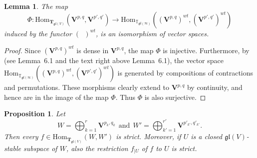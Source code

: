 \documentclass[12pt,reqno]{amsart}
\newcommand{\Hom}{\mathrm{Hom}}
\newtheorem{lem}[thm]{Lemma}
\newtheorem{prop}[thm]{Proposition}
\theoremstyle{definition}
\theoremstyle{remark}
\begin{document}
	
	\begin{lem}\label{lem:full}
	The map 
	$$\Phi:\Hom_{\mathbf{T}_{\mathfrak{gl}(V)}}(\mathbf{V}^{p,q}, \mathbf{V}^{p', q'})
	\rightarrow
	\Hom_{\mathbb{T}_{\mathfrak{gl}(\infty)}}((\mathbf{V}^{p,q})^{wt}, (\mathbf{V}^{p', q'})^{wt})
	$$
	induced by the functor $(\phantom{a})^{wt}$, is an isomorphism of vector spaces.
	\end{lem}
	
	\begin{proof}
	Since $(\mathbf{V}^{p,q})^{wt}$ is dense in $\mathbf{V}^{p,q}$, the map $\Phi$ is injective. Furthermore, by \cite{DPS} (see Lemma~6.1 and the text right above Lemma~6.1), the vector space $\Hom_{\mathbb{T}_{\mathfrak{gl}(\infty)}}((\mathbf{V}^{p,q})^{wt}, (\mathbf{V}^{p', q'})^{wt})$ is generated by compositions of contractions and permutations. These morphisms clearly extend  to $\mathbf{V}^{p,q}$ by continuity, and hence are in the image of the map $\Phi$. Thus $\Phi$ is also surjective.
	\end{proof}
	
	\begin{prop}\label{prop:strict}
	    Let $$W = \bigoplus_{k=1}^r \mathbf{V}^{p_k , q_k} \ \ \mathrm{and} 
	    \ \ W' = \bigoplus_{k'=1}^{r'} \mathbf{V}^{p'_{k'} , q'_{k'}}. $$
	    Then every $f\in\Hom_{\mathbf{T}_{\mathfrak{gl}(V)}}(W, W')$ is strict.
	    Moreover, if $U$ is a closed $\mathfrak{gl}(V)$-stable subspace of $W$, also the restriction $f_{|U}$ of $f$ to $U$ is strict.
	\end{prop}
	
\end{document}

